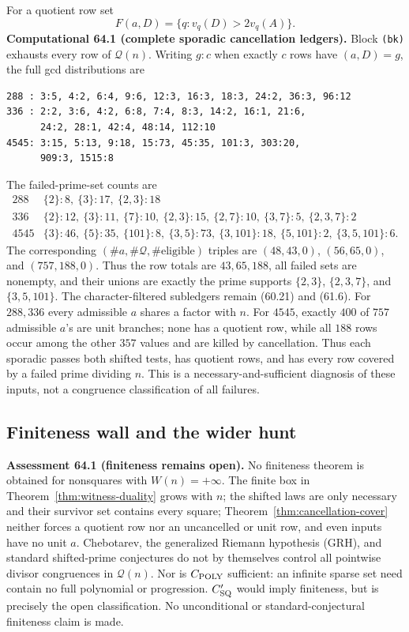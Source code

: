 \documentclass[10pt,reqno]{amsart}
\theoremstyle{definition}
\newcommand{\1}{\mathbf 1}
\begin{document}
For a quotient row set
\begin{equation}\tag{64.11}
                         F(a,D)=\{q:v_q(D)>2v_q(A)\}.
\end{equation}
\medskip\noindent\textbf{Computational 64.1 (complete sporadic cancellation
ledgers).}
Block \texttt{(bk)} exhausts every row of $\mathcal Q(n)$.  Writing $g:c$
when exactly $c$ rows have $(a,D)=g$, the full gcd distributions are
\begin{verbatim}
288 : 3:5, 4:2, 6:4, 9:6, 12:3, 16:3, 18:3, 24:2, 36:3, 96:12
336 : 2:2, 3:6, 4:2, 6:8, 7:4, 8:3, 14:2, 16:1, 21:6,
      24:2, 28:1, 42:4, 48:14, 112:10
4545: 3:15, 5:13, 9:18, 15:73, 45:35, 101:3, 303:20,
      909:3, 1515:8
\end{verbatim}
The failed-prime-set counts are
\begingroup\scriptsize
\begin{equation}\tag{64.12}
\begin{array}{r|l}
288&\{2\}:8,\ \{3\}:17,\ \{2,3\}:18\\
336&\{2\}:12,\ \{3\}:11,\ \{7\}:10,\ \{2,3\}:15,
     \ \{2,7\}:10,\ \{3,7\}:5,\ \{2,3,7\}:2\\
4545&\{3\}:46,\ \{5\}:35,\ \{101\}:8,\ \{3,5\}:73,
     \ \{3,101\}:18,\ \{5,101\}:2,\ \{3,5,101\}:6.
\end{array}
\end{equation}
\endgroup
The corresponding $(\#a,\#\mathcal Q,\#\mathrm{eligible})$ triples are
$(48,43,0)$, $(56,65,0)$, and $(757,188,0)$.  Thus the row totals are
$43,65,188$, all failed sets are nonempty, and their unions are exactly the
prime supports $\{2,3\}$, $\{2,3,7\}$, and $\{3,5,101\}$.  The character-filtered subledgers remain (60.21) and
(61.6).  For $288,336$ every admissible $a$ shares a factor with $n$.  For
$4545$, exactly $400$ of $757$ admissible $a$'s are unit branches; none has
a quotient row, while all $188$ rows occur among the other $357$ values and
are killed by cancellation.  Thus each sporadic passes both shifted tests,
has quotient rows, and has every row covered by a failed prime dividing
$n$.  This is a necessary-and-sufficient diagnosis of these inputs, not a
congruence classification of all failures.

\subsection{Finiteness wall and the wider hunt}
\medskip\noindent\textbf{Assessment 64.1 (finiteness remains open).}
No finiteness theorem is obtained for nonsquares with $W(n)=+\infty$.
The finite box in Theorem~\ref{thm:witness-duality} grows with $n$; the
shifted laws are only necessary and their survivor set contains every
square; Theorem~\ref{thm:cancellation-cover} neither forces a quotient row
nor an uncancelled or unit row, and even inputs have no unit $a$.
Chebotarev, the generalized Riemann hypothesis (GRH), and standard
shifted-prime conjectures do not by themselves control all pointwise divisor
congruences in $\mathcal Q(n)$.  Nor is $C_{\rm POLY}$ sufficient: an
infinite sparse set need contain no full polynomial or progression.
$C_{\rm SQ}'$ would imply finiteness, but is precisely the open
classification.  No unconditional or standard-conjectural finiteness claim
is made.
\end{document}
